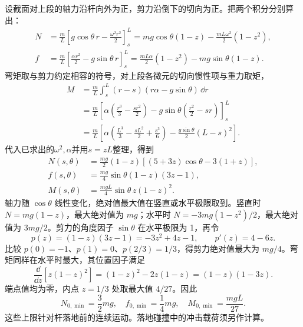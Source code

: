 \begin{solution}
设截面对上段的轴力沿杆向外为正，剪力沿倒下的切向为正。把两个积分分别算出：
\[
\begin{aligned}
N&=\frac mL\left[g\cos\theta\,r-\frac{\omega^2r^2}{2}\right]_s^L
=mg\cos\theta(1-z)-\frac{mL\omega^2}{2}(1-z^2),\\
f&=\frac mL\left[\frac{\alpha r^2}{2}-g\sin\theta\,r\right]_s^L
=\frac{mL\alpha}{2}(1-z^2)-mg\sin\theta(1-z).
\end{aligned}
\]
弯矩取与剪力约定相容的符号，对上段各微元的切向惯性项与重力取矩，
\[
\begin{aligned}
M&=\frac mL\int_s^L(r-s)(r\alpha-g\sin\theta)\,\dd r\\
&=\frac mL\left[\alpha\left(\frac{r^3}{3}-\frac{sr^2}{2}\right)
-g\sin\theta\left(\frac{r^2}{2}-sr\right)\right]_s^L\\
&=\frac mL\left[\alpha\left(\frac{L^3}{3}-\frac{sL^2}{2}+\frac{s^3}{6}\right)
-\frac{g\sin\theta}{2}(L-s)^2\right].
\end{aligned}
\]
代入已求出的$\omega^2,\alpha$并用$s=zL$整理，得到
\begin{align*}
 N(s,\theta)&=\frac{mg}{2}(1-z)[(5+3z)\cos\theta-3(1+z)],\\
 f(s,\theta)&=\frac{mg}{4}\sin\theta(1-z)(3z-1),\\
 M(s,\theta)&=\frac{mgL}{4}\sin\theta\,z(1-z)^2.
\end{align*}
轴力随 $\cos\theta$ 线性变化，绝对值最大值在竖直或水平极限取到。竖直时 $N=mg(1-z)$，最大绝对值为 $mg$；水平时 $N=-3mg(1-z^2)/2$，最大绝对值为 $3mg/2$。剪力的角度因子 $\sin\theta$ 在水平极限为 1，再令
\[
p(z)=(1-z)(3z-1)=-3z^2+4z-1,\qquad p'(z)=4-6z.
\]
比较 $p(0)=-1$、$p(1)=0$、$p(2/3)=1/3$，得剪力绝对值最大为 $mg/4$。弯矩同样在水平时最大，其位置因子满足
\[
\frac{\dd}{\dd z}[z(1-z)^2]
=(1-z)^2-2z(1-z)=(1-z)(1-3z).
\]
端点值均为零，内点 $z=1/3$ 处取最大值 $4/27$。因此
\[
 \boxed{N_{0,\min}=\frac32mg,\quad f_{0,\min}=\frac14mg,
 \quad M_{0,\min}=\frac{mgL}{27}}.
\]
这些上限针对杆落地前的连续运动。落地碰撞中的冲击载荷须另作计算。


\end{solution}



